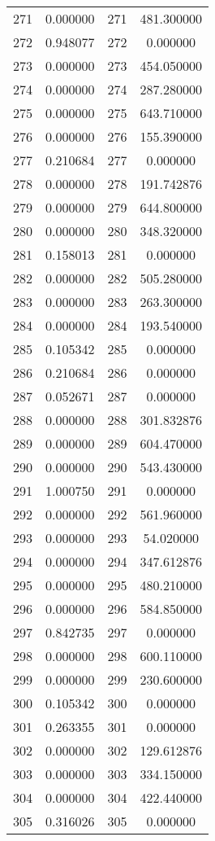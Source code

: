 \documentclass[12pt]{article}
\begin{document}
\begin{longtable}{@{}cccc@{}}
271 & 0.000000 & 271 & 481.300000 \\
272 & 0.948077 & 272 & 0.000000 \\
273 & 0.000000 & 273 & 454.050000 \\
274 & 0.000000 & 274 & 287.280000 \\
275 & 0.000000 & 275 & 643.710000 \\
276 & 0.000000 & 276 & 155.390000 \\
277 & 0.210684 & 277 & 0.000000 \\
278 & 0.000000 & 278 & 191.742876 \\
279 & 0.000000 & 279 & 644.800000 \\
280 & 0.000000 & 280 & 348.320000 \\
281 & 0.158013 & 281 & 0.000000 \\
282 & 0.000000 & 282 & 505.280000 \\
283 & 0.000000 & 283 & 263.300000 \\
284 & 0.000000 & 284 & 193.540000 \\
285 & 0.105342 & 285 & 0.000000 \\
286 & 0.210684 & 286 & 0.000000 \\
287 & 0.052671 & 287 & 0.000000 \\
288 & 0.000000 & 288 & 301.832876 \\
289 & 0.000000 & 289 & 604.470000 \\
290 & 0.000000 & 290 & 543.430000 \\
291 & 1.000750 & 291 & 0.000000 \\
292 & 0.000000 & 292 & 561.960000 \\
293 & 0.000000 & 293 & 54.020000 \\
294 & 0.000000 & 294 & 347.612876 \\
295 & 0.000000 & 295 & 480.210000 \\
296 & 0.000000 & 296 & 584.850000 \\
297 & 0.842735 & 297 & 0.000000 \\
298 & 0.000000 & 298 & 600.110000 \\
299 & 0.000000 & 299 & 230.600000 \\
300 & 0.105342 & 300 & 0.000000 \\
301 & 0.263355 & 301 & 0.000000 \\
302 & 0.000000 & 302 & 129.612876 \\
303 & 0.000000 & 303 & 334.150000 \\
304 & 0.000000 & 304 & 422.440000 \\
305 & 0.316026 & 305 & 0.000000 \\

\end{longtable}
\end{document}
